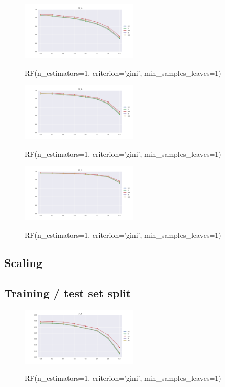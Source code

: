 \documentclass{sig-alternate-05-2015}
\begin{document}
\begin{figure}[]
  \centering
  \caption{RF(n\_estimators=1, criterion='gini', min\_samples\_leaves=1)}
  \includegraphics[width=0.5\textwidth]{../plots/RF_A}
  \label{fig:anomalySetup}
\end{figure}

\begin{figure}[]
  \centering
  \caption{RF(n\_estimators=1, criterion='gini', min\_samples\_leaves=1)}
  \includegraphics[width=0.5\textwidth]{../plots/RF_B}
  \label{fig:anomalySetup}
\end{figure}

\begin{figure}[]
  \centering
  \caption{RF(n\_estimators=1, criterion='gini', min\_samples\_leaves=1)}
  \includegraphics[width=0.5\textwidth]{../plots/RF_C}
  \label{fig:anomalySetup}
\end{figure}





\subsection{Scaling}

\subsection{Training / test set split}

\begin{figure}[]
  \centering
  \caption{RF(n\_estimators=1, criterion='gini', min\_samples\_leaves=1)}
  \includegraphics[width=0.5\textwidth]{../plots/LR_1}
  \label{fig:anomalySetup}
\end{figure}
\end{document}
